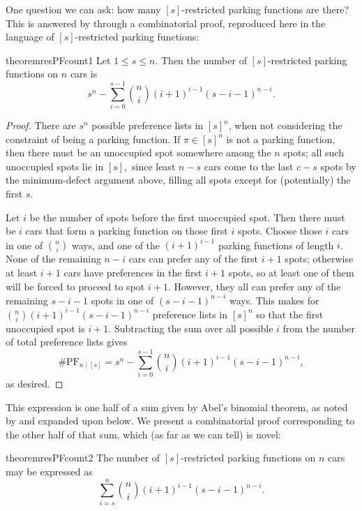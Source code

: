 \documentclass[12 pt]{amsart}
\theoremstyle{definition} %
\theoremstyle{remark} %
\begin{document}
One question we can ask: how many $[s]$-restricted parking functions are there? This is answered by \cite{cameron-johannsen-prellberg-schweitzer-2008} through a combinatorial proof, reproduced here in the language of $[s]$-restricted parking functions:

\begin{restatable}{theorem}{resPFcount1}
    \label{thm:resPFcount1}
    Let $1\le s\le n.$ Then the number of $[s]$-restricted parking functions on $n$ cars is
    \[s^{n} - \sum_{i = 0}^{s - 1} \binom{n}{i} (i + 1)^{i - 1} (s - i - 1)^{n - i}.\]
\end{restatable}

\begin{proof}
    There are $s^{n}$ possible preference lists in $[s]^{n}$, when not considering the constraint of being a parking function. If $\pi \in [s]^{n}$ is not a parking function, then there must be an unoccupied spot somewhere among the $n$ spots; all such unoccupied spots lie in $[s],$ since least $n - s$ cars come to the last $c - s$ spots by the minimum-defect argument above, filling all spots except for (potentially) the first $s$.

	Let $i$ be the number of spots before the first unoccupied spot. Then there must be $i$ cars that form a parking function on those first $i$ spots. Choose those $i$ cars in one of $\binom{n}{i}$ ways, and one of the $(i + 1)^{i - 1}$ parking functions of length $i$. None of the remaining $n - i$ cars can prefer any of the first $i + 1$ spots; otherwise at least $i+1$ cars have preferences in the first $i+1$ spots, so at least one of them will be forced to proceed to spot $i+1$. However, they all can prefer any of the remaining $s - i - 1$ spots in one of $(s - i - 1)^{n - i}$ ways. This makes for $\binom{n}{i} (i + 1)^{i - 1}(s - i - 1)^{n - i}$ preference lists in $[s]^{n}$ so that the first unoccupied spot is $i + 1$. Subtracting the sum over all possible $i$ from the number of total preference lists gives
	\[
		\# \mathrm{PF}_{n \mid [s]} = s^{n} - \sum_{i = 0}^{s - 1} \binom{n}{i} (i + 1)^{i - 1} (s - i - 1)^{n - i},
	\]
    as desired.
\end{proof}

This expression is one half of a sum given by Abel's binomial theorem, as noted by \cite{cameron-johannsen-prellberg-schweitzer-2008} and expanded upon below. We present a combinatorial proof corresponding to the other half of that sum, which (as far as we can tell) is novel:

\begin{restatable}{theorem}{resPFcount2}
    \label{thm:resPFcount2}
    The number of $[s]$-restricted parking functions on $n$ cars may be expressed as
    \[\sum_{i = s}^{n} \binom{n}{i} (i + 1)^{i - 1} (s - i - 1)^{n - i}.\]
\end{restatable}
\end{document}

